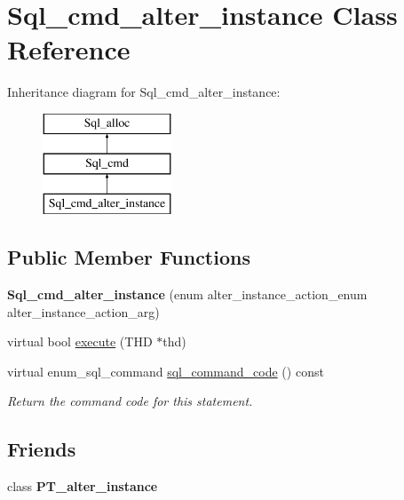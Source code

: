 \hypertarget{classSql__cmd__alter__instance}{}\section{Sql\+\_\+cmd\+\_\+alter\+\_\+instance Class Reference}
\label{classSql__cmd__alter__instance}
Inheritance diagram for Sql\+\_\+cmd\+\_\+alter\+\_\+instance\+:\begin{figure}[H]
\begin{center}
\leavevmode
\includegraphics[height=3.000000cm]{classSql__cmd__alter__instance}
\end{center}
\end{figure}
\subsection*{Public Member Functions}
\begin{DoxyCompactItemize}
\item 
\mbox{\label{classSql__cmd__alter__instance_a5e4ece3d0d29b03dd20b4679586649d2}} 
{\bfseries Sql\+\_\+cmd\+\_\+alter\+\_\+instance} (enum alter\+\_\+instance\+\_\+action\+\_\+enum alter\+\_\+instance\+\_\+action\+\_\+arg)
\item 
virtual bool \mbox{\hyperlink{classSql__cmd__alter__instance_a20c7c73bdbc58422a829474682fdf8c4}{execute}} (T\+HD $\ast$thd)
\item 
\mbox{\label{classSql__cmd__alter__instance_a2a644132a7f4c79d5c779abc516e3611}} 
virtual enum\+\_\+sql\+\_\+command \mbox{\hyperlink{classSql__cmd__alter__instance_a2a644132a7f4c79d5c779abc516e3611}{sql\+\_\+command\+\_\+code}} () const
\begin{DoxyCompactList}\small\item\em Return the command code for this statement. \end{DoxyCompactList}\end{DoxyCompactItemize}
\subsection*{Friends}
\begin{DoxyCompactItemize}
\item 
\mbox{\label{classSql__cmd__alter__instance_a4b185ee675e397aac49713d91fe468ed}} 
class {\bfseries P\+T\+\_\+alter\+\_\+instance}
\end{DoxyCompactItemize}
